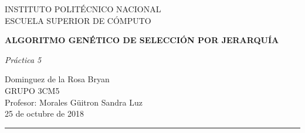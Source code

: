 \begin{titlepage}
\begin{center}
\begin{LARGE}
INSTITUTO POLITÉCNICO NACIONAL\\
\vspace*{0.15in}
ESCUELA SUPERIOR DE CÓMPUTO\\
\end{LARGE}
\vspace*{1.0in}
\begin{Large}
\textbf{ALGORITMO GENÉTICO DE SELECCIÓN POR JERARQUÍA} \\  
\end{Large}
\vspace*{0.2in}
\begin{large}
\textit{Práctica 5}\\
\end{large}
\vspace*{1.0in}
\begin{large}
Dominguez de la Rosa Bryan\\
\vspace*{2.0in}
GRUPO 3CM5\\
\vspace*{0.2in}
Profesor: Morales Güitron Sandra Luz\\
\vspace*{1.5in}
25 de octubre de 2018
\vspace*{0.3in}
\end{large}
\rule{150mm}{0.1mm}\\

\end{center}
\end{titlepage}
